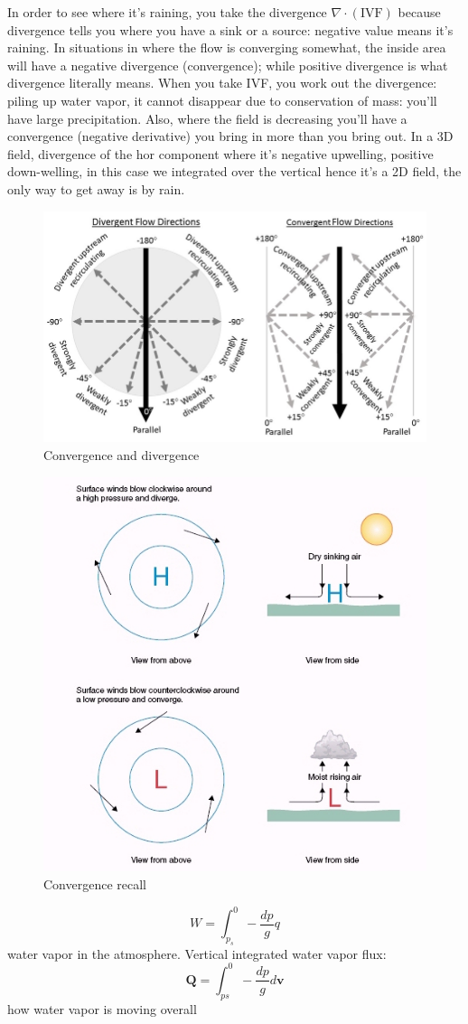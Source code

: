In order to see where it's raining, you take the divergence $\nabla\cdot (\text{IVF})$ because divergence tells you where you have a sink or a source: negative value means it's raining. In situations in where the flow is converging somewhat, the inside area will have a negative divergence (convergence); while positive divergence is what divergence literally means. When you take IVF, you work out the divergence: piling up water vapor, it cannot disappear due to conservation of mass: you'll have large precipitation.
Also, where the field is decreasing you'll have a convergence (negative derivative) you bring in more than you bring out. In a 3D field, divergence of the hor component where it's negative upwelling, positive down-welling, in this case we integrated over the vertical hence it's a 2D field, the only way to get away is by rain.
\begin{figure}[htpb]
    \centering
    \includegraphics[width=0.5\linewidth]{uploads/divergence.png}
    \caption{Convergence and divergence}
    \label{fig:conv}
\end{figure}
\begin{figure}[htpb]
    \centering
    \includegraphics[width=0.5\linewidth]{uploads/convergence recall.png}
    \caption{Convergence recall}
\end{figure}

$$W=\int_{p_s}^0-\frac{dp}{g}q$$ water vapor in the atmosphere.
Vertical integrated water vapor flux: 
$$\mathbf{Q}=\int_{ps}^0-\frac{dp}{g}d\mathbf{v}$$ how water vapor is moving overall

